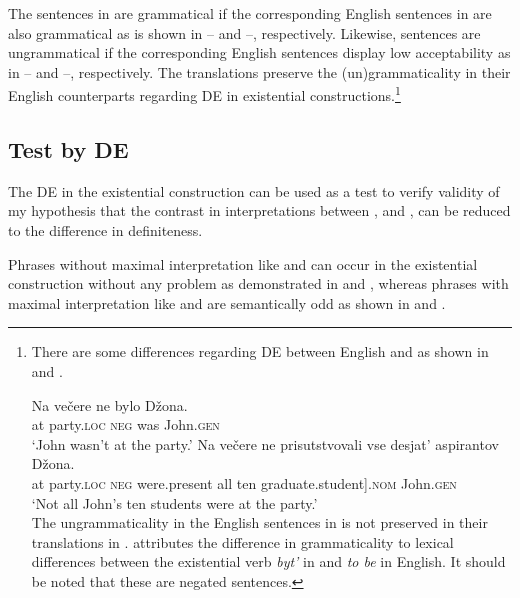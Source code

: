 \documentclass[output=paper,
colorlinks,
citecolor=brown,
newtxmath
]{langscibook}
\begin{document}
\noindent The  sentences in  are grammatical if the corresponding English sentences in  are also grammatical as is shown in -- and --, respectively. Likewise,  sentences are ungrammatical if the corresponding English sentences display low acceptability as in -- and --, respectively. The  translations preserve the (un)grammaticality in their English counterparts regarding DE in existential constructions.\footnote{There are some differences regarding DE between English and  as shown in  and .
    \ea\label{john-engl}
	\z\z

	\ea\label{Dzon}
	\ea
	\gll	Na večere ne bylo Džona.\\
	at party.\textsc{loc} \textsc{neg} was John.\textsc{gen}\\
	\glt `John wasn't at the party.'
	\ex
	\gll	Na večere ne prisutstvovali {} vse desjat' aspirantov Džona.\\
	at party.\textsc{loc} \textsc{neg} were.present \minsp{[} all ten graduate.student].\textsc{nom} John.\textsc{gen}\\
	\glt `Not all John's ten students were at the party.'
	\\ \hfill \citep[134-135]{Paducheva2000}
	\z\z
    \noindent The ungrammaticality in the English sentences in  is not preserved in their  translations in . \citet{Paducheva2000} attributes the difference in grammaticality to lexical differences between the existential verb \textit{byt'} in  and \textit{to be} in English. It should be noted that these are negated sentences.}

\subsection{Test by DE}\label{sec:testDE}

The  DE in the existential construction can be used as a test to verify validity of my hypothesis that the contrast in interpretations between ,  and ,  can be reduced to the difference in definiteness.

Phrases without maximal interpretation like  and  can occur in the existential construction without any problem as demonstrated in  and , whereas phrases with maximal interpretation like  and  are semantically odd as shown in  and .
\end{document}
